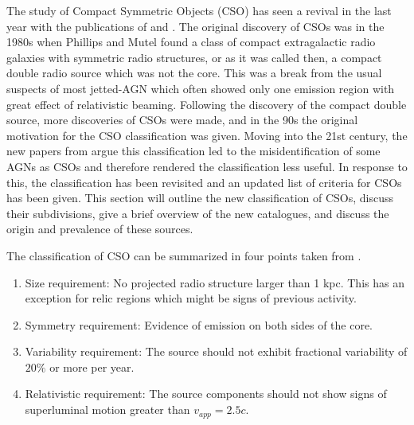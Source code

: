 
\label{sec:CSO}

The study of Compact Symmetric Objects (CSO) has seen a revival in the last year with the publications of \cite{kiehlmann2023compact} and \cite{readhead2023compact}. The original discovery of CSOs was in the 1980s when Phillips and Mutel found a class of compact extragalactic radio galaxies with symmetric radio structures, or as it was called then, a compact double radio source which was not the core. This was a break from the usual suspects of most jetted-AGN which often showed only one emission region with great effect of relativistic beaming. Following the discovery of the compact double source, more discoveries of CSOs were made, and in the 90s the original motivation for the CSO classification was given. Moving into the 21st century, the new papers from \cite{kiehlmann2023compact} argue this classification led to the misidentification of some AGNs as CSOs and therefore rendered the classification less useful. In response to this, the classification has been revisited and an updated list of criteria for CSOs has been given. This section will outline the new classification of CSOs, discuss their subdivisions, give a brief overview of the new catalogues, and discuss the origin and prevalence of these sources.

The classification of CSO can be summarized in four points taken from \cite{kiehlmann2023compact}. 

\begin{enumerate}
    \item Size requirement: No projected radio structure larger than 1 kpc. This has an exception for relic regions which might be signs of previous activity.
    \item Symmetry requirement: Evidence of emission on both sides of the core.
    \item Variability requirement: The source should not exhibit fractional variability of $20\%$ or more per year.
    \item Relativistic requirement: The source components should not show signs of superluminal motion greater than $v_{app} = 2.5c$.
\end{enumerate}

